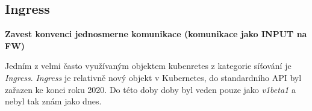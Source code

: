 
\subsection{Ingress}
\textbf{Zavest konvenci jednosmerne komunikace (komunikace jako INPUT na FW)}

Jedním z velmi často využívaným objektem kubenretes z kategorie síťování je \textit{Ingress}. \textit{Ingress} je relativně nový objekt v Kubernetes, do standardního API byl zařazen ke konci roku 2020\cite{k8scirobot_2020_merge}. Do této doby doby byl veden pouze jako \textit{v1beta1}\cite{kashin_2021_gateway} a nebyl tak znám jako dnes.

